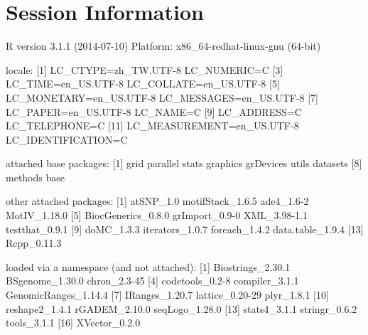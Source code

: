 \documentclass[a4paper,10pt]{article}
\begin{document}
\section{Session Information}

\begin{Schunk}
\begin{Soutput}
R version 3.1.1 (2014-07-10)
Platform: x86_64-redhat-linux-gnu (64-bit)

locale:
 [1] LC_CTYPE=zh_TW.UTF-8       LC_NUMERIC=C              
 [3] LC_TIME=en_US.UTF-8        LC_COLLATE=en_US.UTF-8    
 [5] LC_MONETARY=en_US.UTF-8    LC_MESSAGES=en_US.UTF-8   
 [7] LC_PAPER=en_US.UTF-8       LC_NAME=C                 
 [9] LC_ADDRESS=C               LC_TELEPHONE=C            
[11] LC_MEASUREMENT=en_US.UTF-8 LC_IDENTIFICATION=C       

attached base packages:
[1] grid      parallel  stats     graphics  grDevices utils     datasets 
[8] methods   base     

other attached packages:
 [1] atSNP_1.0          motifStack_1.6.5   ade4_1.6-2         MotIV_1.18.0      
 [5] BiocGenerics_0.8.0 grImport_0.9-0     XML_3.98-1.1       testthat_0.9.1    
 [9] doMC_1.3.3         iterators_1.0.7    foreach_1.4.2      data.table_1.9.4  
[13] Rcpp_0.11.3       

loaded via a namespace (and not attached):
 [1] Biostrings_2.30.1    BSgenome_1.30.0      chron_2.3-45        
 [4] codetools_0.2-8      compiler_3.1.1       GenomicRanges_1.14.4
 [7] IRanges_1.20.7       lattice_0.20-29      plyr_1.8.1          
[10] reshape2_1.4.1       rGADEM_2.10.0        seqLogo_1.28.0      
[13] stats4_3.1.1         stringr_0.6.2        tools_3.1.1         
[16] XVector_0.2.0       
\end{Soutput}
\end{Schunk}


%


\end{document}
